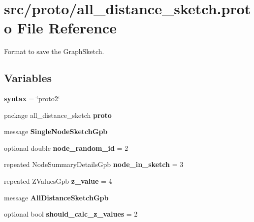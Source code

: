 \hypertarget{all__distance__sketch_8proto}{}\section{src/proto/all\+\_\+distance\+\_\+sketch.proto File Reference}
\label{all__distance__sketch_8proto}


Format to save the Graph\+Sketch.  


\subsection*{Variables}
\begin{DoxyCompactItemize}
\item 
\hypertarget{all__distance__sketch_8proto_adbedb258e13546cc707a6ebb073a3d8a}{}{\bfseries syntax} = \char`\"{}proto2\char`\"{}\label{all__distance__sketch_8proto_adbedb258e13546cc707a6ebb073a3d8a}

\item 
\hypertarget{all__distance__sketch_8proto_a0c41dcc24abdb230ee669507323945ae}{}package all\+\_\+distance\+\_\+sketch {\bfseries proto}\label{all__distance__sketch_8proto_a0c41dcc24abdb230ee669507323945ae}

\item 
message {\bfseries Single\+Node\+Sketch\+Gpb}
\item 
\hypertarget{all__distance__sketch_8proto_a231dd4f63581ac1949ea45cc0b5db5db}{}optional double {\bfseries node\+\_\+random\+\_\+id} = 2\label{all__distance__sketch_8proto_a231dd4f63581ac1949ea45cc0b5db5db}

\item 
\hypertarget{all__distance__sketch_8proto_af8c7e6fa3bca8fe537ed8a6e6e3825fd}{}repeated Node\+Summary\+Details\+Gpb {\bfseries node\+\_\+in\+\_\+sketch} = 3\label{all__distance__sketch_8proto_af8c7e6fa3bca8fe537ed8a6e6e3825fd}

\item 
\hypertarget{all__distance__sketch_8proto_ae5088bdd003d5e97dde2c5fbcddde34e}{}repeated Z\+Values\+Gpb {\bfseries z\+\_\+value} = 4\label{all__distance__sketch_8proto_ae5088bdd003d5e97dde2c5fbcddde34e}

\item 
message {\bfseries All\+Distance\+Sketch\+Gpb}
\item 
\hypertarget{all__distance__sketch_8proto_a32963866b255f89d4a856253fd8b9c92}{}optional bool {\bfseries should\+\_\+calc\+\_\+z\+\_\+values} = 2\label{all__distance__sketch_8proto_a32963866b255f89d4a856253fd8b9c92}


\end{DoxyCompactItemize}
